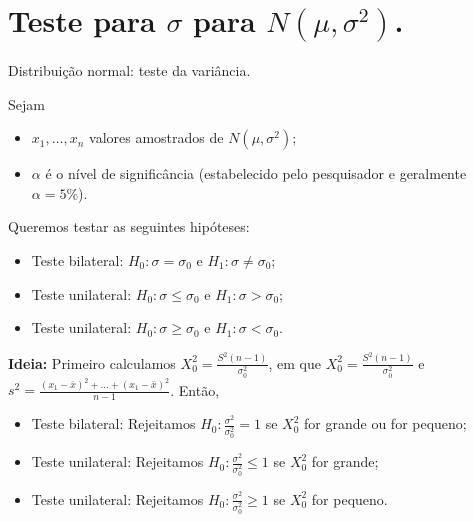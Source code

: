 \documentclass[8pt]{beamer}
\begin{document}
\section{Teste para $\sigma$ para $N(\mu, \sigma^2)$.}

\begin{frame}{Distribuição normal: teste da variância.}

\normalsize

Sejam
\begin{itemize}
	\item $x_1, \dots, x_n$ valores amostrados de $N(\mu, \sigma^2)$;
	\item $\alpha$ é o nível de significância (estabelecido pelo pesquisador e geralmente $\alpha=5\%$). 
\end{itemize}
\vfill

Queremos testar as seguintes hipóteses:
\begin{itemize}
	\item Teste bilateral: $H_0: \sigma= \sigma_0$ e $H_1: \sigma \neq \sigma_0$;
	\item Teste unilateral: $H_0: \sigma \leq \sigma_0$ e $H_1: \sigma > \sigma_0$;
	\item Teste unilateral: $H_0: \sigma \geq \sigma_0$ e $H_1: \sigma < \sigma_0$.
\end{itemize}
\vfill

\textbf{Ideia:} Primeiro calculamos $X_0^2=\frac{S^2 (n-1)}{\sigma_0^2}$, em que $X_0^2 = \frac{S^2 (n-1)}{\sigma_0^2}$ e $s^2=\frac{(x_1-\bar{x})^2 + \dots + (x_1-\bar{x})^2}{n-1}$. Então, 
\begin{itemize}
	\item Teste bilateral: Rejeitamos $H_0: \frac{\sigma^2}{\sigma_0^2} =1$ se $ X_0^2 $ for grande ou for pequeno;
	\item Teste unilateral: Rejeitamos $H_0: \frac{\sigma^2}{\sigma_0^2}\leq 1$ se $X_0^2 $ for grande;
	\item Teste unilateral: Rejeitamos $H_0: \frac{\sigma^2}{\sigma_0^2}\geq 1$ se $X_0^2 $ for pequeno.
\end{itemize}

\end{frame}
\end{document}
